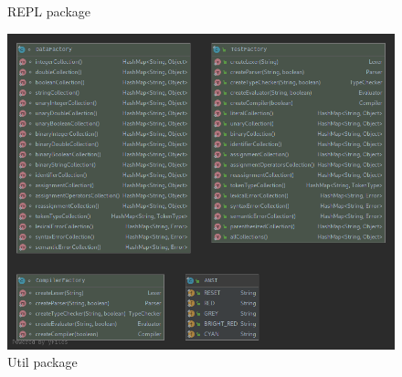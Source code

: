 \documentclass[
]{report}
\begin{document}
\begin{appendices}
\begin{figure}
		\caption{REPL package}
		\label{fig:repl-package-diagram}
	\end{figure}
	\begin{figure}
		\centering
		\includegraphics[width=\textwidth]{util-package-diagram}
		\caption{Util package}
		\label{fig:util-package-diagram}
	\end{figure}


\end{appendices}
\end{document}
